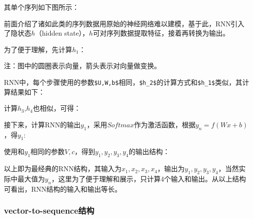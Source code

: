 其单个序列如下图所示：


前面介绍了诸如此类的序列数据用原始的神经网络难以建模，基于此，RNN引入了隐状态\(h\)（hidden
state），\(h​\)可对序列数据提取特征，接着再转换为输出。

为了便于理解，先计算\(h_1​\)：


注：图中的圆圈表示向量，箭头表示对向量做变换。

RNN中，每个步骤使用的参数\texttt{\$U,W,b\$}​相同，\texttt{\$h\_2\$}的计算方式和\texttt{\$h\_1​\$}类似，其计算结果如下：


计算\(h_3\),\(h_4​\)也相似，可得：


接下来，计算RNN的输出\(y_1\)，采用\(Softmax\)作为激活函数，根据\(y_n=f(Wx+b)\)，得\(y_1​\):


使用和\(y_1​\)相同的参数\(V,c​\)，得到\(y_1,y_2,y_3,y_4​\)的输出结构：


以上即为最经典的RNN结构，其输入为\(x_1,x_2,x_3,x_4\)，输出为\(y_1,y_2,y_3,y_4\)，当然实际中最大值为\(y_n\)，这里为了便于理解和展示，只计算4个输入和输出。从以上结构可看出，RNN结构的输入和输出等长。

\subsubsection{vector-to-sequence结构}\label{vector-to-sequenceux7ed3ux6784}

